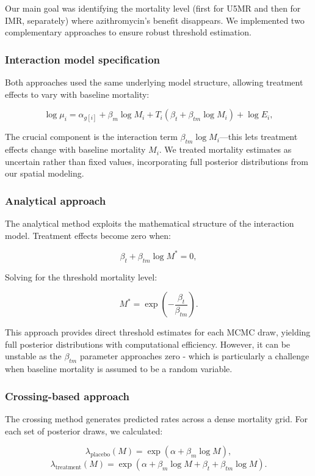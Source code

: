\documentclass[11pt]{article}\usepackage[]{graphicx}\usepackage[]{xcolor}
\begin{document}
Our main goal was identifying the mortality level (first for U5MR and then for IMR, separately) where azithromycin's benefit disappears. We implemented two complementary approaches to ensure robust threshold estimation.

\subsubsection{Interaction model specification}

Both approaches used the same underlying model structure, allowing treatment effects to vary with baseline mortality:

\[
\log \mu_i = \alpha_{g[i]} + \beta_m \log M_i + T_i(\beta_t + \beta_{tm}\log M_i) + \log E_i,
\]

The crucial component is the interaction term $\beta_{tm}\log M_i$---this lets treatment effects change with baseline mortality $M_i$. We treated mortality estimates as uncertain rather than fixed values, incorporating full posterior distributions from our spatial modeling.

\subsubsection{Analytical approach}

The analytical method exploits the mathematical structure of the interaction model. Treatment effects become zero when:

\[
\beta_t + \beta_{tm} \log M^* = 0,
\]

Solving for the threshold mortality level:

\[
M^* = \exp\left(-\frac{\beta_t}{\beta_{tm}}\right).
\]

This approach provides direct threshold estimates for each MCMC draw, yielding full posterior distributions with computational efficiency. However, it can be unstable as the $\beta_{tm}$ parameter approaches zero - which is particularly a challenge when baseline mortality is assumed to be a random variable.

\subsubsection{Crossing-based approach}

The crossing method generates predicted rates across a dense mortality grid. For each set of posterior draws, we calculated:

\[
\lambda_{\text{placebo}}(M) = \exp(\alpha + \beta_m \log M),
\]
\[
\lambda_{\text{treatment}}(M) = \exp(\alpha + \beta_m \log M + \beta_t + \beta_{tm} \log M).
\]
\end{document}
